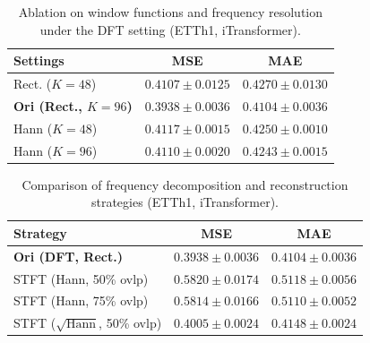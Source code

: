 \documentclass[sigconf,anonymous,review]{acmart}
\newcommand{\methodn}{\textsc{TIFO}}
\newcommand{\method}{\textsc{\methodn}\xspace}
\begin{document}


\begin{table}[t]
\centering
\caption{Ablation on window functions and frequency resolution under the DFT setting (ETTh1, iTransformer).}
\label{tab:ablation_window}
\small
\setlength{\tabcolsep}{4pt}
\begin{tabular}{lcc}
\toprule
Settings & MSE & MAE \\
\midrule
Rect. ($K=48$) & $0.4107 \pm 0.0125$ & $0.4270 \pm 0.0130$ \\
\textbf{Ori (Rect., $K=96$)} & $\mathbf{0.3938 \pm 0.0036}$ & $\mathbf{0.4104 \pm 0.0036}$ \\
Hann ($K=48$) & $0.4117 \pm 0.0015$ & $0.4250 \pm 0.0010$ \\
Hann ($K=96$) & $0.4110 \pm 0.0020$ & $0.4243 \pm 0.0015$ \\
\bottomrule
\end{tabular}
\end{table}

\begin{table}[t]
\centering
\caption{Comparison of frequency decomposition and reconstruction strategies (ETTh1, iTransformer).}
\label{tab:ablation_recon}
\small
\setlength{\tabcolsep}{4pt}
\begin{tabular}{lcc}
\toprule
Strategy & MSE & MAE \\
\midrule
\textbf{Ori (DFT, Rect.)} & $\mathbf{0.3938 \pm 0.0036}$ & $\mathbf{0.4104 \pm 0.0036}$ \\
STFT (Hann, 50\% ovlp) & $0.5820 \pm 0.0174$ & $0.5118 \pm 0.0056$ \\
STFT (Hann, 75\% ovlp) & $0.5814 \pm 0.0166$ & $0.5110 \pm 0.0052$ \\
STFT ($\sqrt{\text{Hann}}$, 50\% ovlp) & $0.4005 \pm 0.0024$ & $0.4148 \pm 0.0024$ \\
\bottomrule
\end{tabular}
\end{table}
\end{document}
